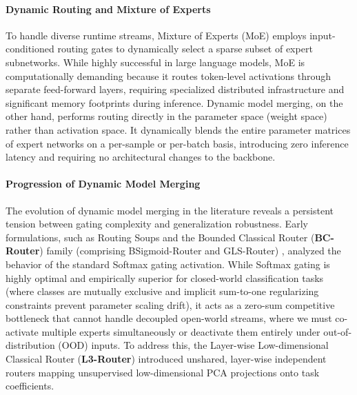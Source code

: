 \paragraph{Dynamic Routing and Mixture of Experts}
To handle diverse runtime streams, Mixture of Experts (MoE) \cite{jacobs1991adaptive, shazeer2017outrageously, switch_transformer} employs input-conditioned routing gates to dynamically select a sparse subset of expert subnetworks. While highly successful in large language models, MoE is computationally demanding because it routes token-level activations through separate feed-forward layers, requiring specialized distributed infrastructure and significant memory footprints during inference. Dynamic model merging, on the other hand, performs routing directly in the parameter space (weight space) rather than activation space. It dynamically blends the entire parameter matrices of expert networks on a per-sample or per-batch basis, introducing zero inference latency and requiring no architectural changes to the backbone.

\paragraph{Progression of Dynamic Model Merging}
The evolution of dynamic model merging in the literature reveals a persistent tension between gating complexity and generalization robustness. Early formulations, such as Routing Soups \cite{routing_soup} and the Bounded Classical Router (\textbf{BC-Router}) family (comprising BSigmoid-Router and GLS-Router) \cite{bc_router}, analyzed the behavior of the standard Softmax gating activation. While Softmax gating is highly optimal and empirically superior for closed-world classification tasks (where classes are mutually exclusive and implicit sum-to-one regularizing constraints prevent parameter scaling drift), it acts as a zero-sum competitive bottleneck that cannot handle decoupled open-world streams, where we must co-activate multiple experts simultaneously or deactivate them entirely under out-of-distribution (OOD) inputs. To address this, the Layer-wise Low-dimensional Classical Router (\textbf{L3-Router}) \cite{l3_router_orig} introduced unshared, layer-wise independent routers mapping unsupervised low-dimensional PCA projections onto task coefficients. 

